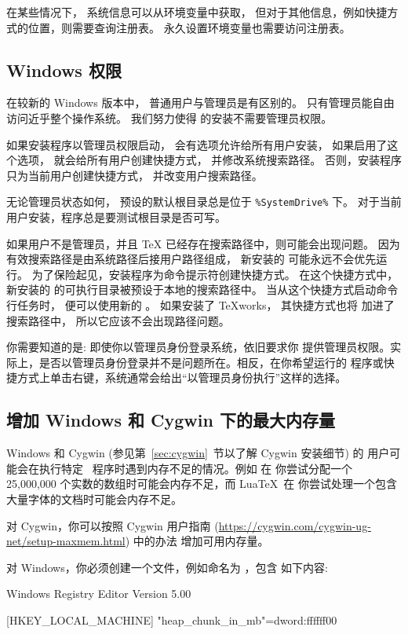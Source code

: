\documentclass{article}
\begin{document}
在某些情况下，
系统信息可以从环境变量中获取，
但对于其他信息，例如快捷方式的位置，则需要查询注册表。
永久设置环境变量也需要访问注册表。

\subsection{Windows 权限}
\label{sec:winpermissions}

在较新的 Windows 版本中，
普通用户与管理员是有区别的。
只有管理员能自由访问近乎整个操作系统。
我们努力使得 \TL{} 的安装不需要管理员权限。

如果安装程序以管理员权限启动，
会有选项允许给所有用户安装，
如果启用了这个选项，
就会给所有用户创建快捷方式，
并修改系统搜索路径。
否则，安装程序只为当前用户创建快捷方式，
并改变用户搜索路径。

无论管理员状态如何，
\TL{} 预设的默认根目录总是位于 \verb|%SystemDrive%| 下。
对于当前用户安装，程序总是要测试根目录是否可写。

如果用户不是管理员，并且 \TeX{} 已经存在搜索路径中，则可能会出现问题。
因为有效搜索路径是由系统路径后接用户路径组成，
新安装的 \TL{} 可能永远不会优先运行。
为了保险起见，安装程序为命令提示符创建快捷方式。
在这个快捷方式中，
新安装的 \TL{} 的可执行目录被预设于本地的搜索路径中。
当从这个快捷方式启动命令行任务时，
便可以使用新的 \TL{}。
如果安装了 \TeX{}works，
其快捷方式也将 \TL{} 加进了搜索路径中，
所以它应该不会出现路径问题。

你需要知道的是: 即使你以管理员身份登录系统，依旧要求你
提供管理员权限。实际上，是否以管理员身份登录并不是问题所在。相反，在你希望运行的
程序或快捷方式上单击右键，系统通常会给出“以管理员身份执行”这样的选择。

\subsection{增加 Windows 和 Cygwin 下的最大内存量}
\label{sec:cygwin-maxmem}

Windows 和 Cygwin (参见第~\ref{sec:cygwin}~节以了解 Cygwin 安装细节) 的
用户可能会在执行特定 \TL\ 程序时遇到内存不足的情况。例如  在
你尝试分配一个 25,000,000 个实数的数组时可能会内存不足，而 Lua\TeX\ 在
你尝试处理一个包含大量字体的文档时可能会内存不足。

对 Cygwin，你可以按照 Cygwin 用户指南
(\url{https://cygwin.com/cygwin-ug-net/setup-maxmem.html}) 中的办法
增加可用内存量。

对 Windows，你必须创建一个文件，例如命名为 ，包含
如下内容: 

\begin{sverbatim}
Windows Registry Editor Version 5.00

[HKEY_LOCAL_MACHINE\Software\Cygwin]
"heap_chunk_in_mb"=dword:ffffff00
\end{sverbatim}
\end{document}

